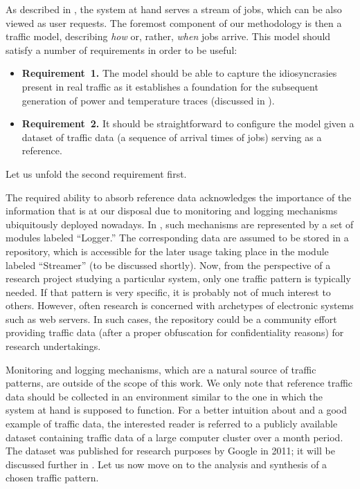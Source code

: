 As described in , the system at hand serves a stream
of jobs, which can be also viewed as user requests. The foremost component of
our methodology is then a traffic model, describing \emph{how} or, rather,
\emph{when} jobs arrive. This model should satisfy a number of requirements in
order to be useful:
\begin{itemize}
  \item {\bfseries Requirement~1.} The model should be able to capture the
  idiosyncrasies present in real traffic as it establishes a foundation for the
  subsequent generation of power and temperature traces (discussed in
  ).

  \item {\bfseries Requirement~2.} It should be straightforward to configure the
  model given a dataset of traffic data (a sequence of arrival times of jobs)
  serving as a reference.
\end{itemize}
Let us unfold the second requirement first.

The required ability to absorb reference data acknowledges the importance of the
information that is at our disposal due to monitoring and logging mechanisms
ubiquitously deployed nowadays. In , such mechanisms are
represented by a set of modules labeled ``Logger.'' The corresponding data are
assumed to be stored in a repository, which is accessible for the later usage
taking place in the module labeled ``Streamer'' (to be discussed shortly). Now,
from the perspective of a research project studying a particular system, only
one traffic pattern is typically needed. If that pattern is very specific, it is
probably not of much interest to others. However, often research is concerned
with archetypes of electronic systems such as web servers. In such cases, the
repository could be a community effort providing traffic data (after a proper
obfuscation for confidentiality reasons) for research undertakings.

Monitoring and logging mechanisms, which are a natural source of traffic
patterns, are outside of the scope of this work. We only note that reference
traffic data should be collected in an environment similar to the one in which
the system at hand is supposed to function. For a better intuition about and a
good example of traffic data, the interested reader is referred to a publicly
available dataset \cite{google} containing traffic data of a large computer
cluster over a month period. The dataset was published for research purposes by
Google in 2011; it will be discussed further in . Let
us now move on to the analysis and synthesis of a chosen traffic pattern.


